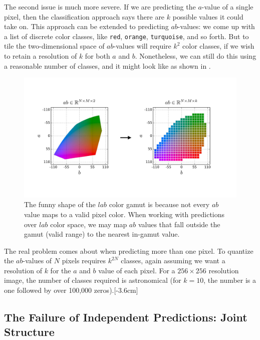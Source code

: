 The second issue is much more severe. If we are predicting the $a$-value of a single pixel, then the classification approach says there are $k$ possible values it could take on. This approach can be extended to predicting $ab$-values: we come up with a list of discrete color classes, like \texttt{red}, \texttt{orange}, \texttt{turquoise}, and so forth. But to tile the two-dimensional space of $ab$-values will require $k^2$ color classes, if we wish to retain a resolution of $k$ for both $a$ and $b$. Nonetheless, we can still do this using a reasonable number of classes, and it might look like as shown in \fig{\ref{fig:conditional_generative_models:color_quantization}}.
\begin{figure}[h!]
    \centerline{
        \includegraphics[width=0.8\linewidth]{./figures/conditional_generative_models/color_quantization.pdf}
    }
    \caption{The funny shape of the $lab$ color gamut is because not every $ab$ value maps to a valid pixel color. When working with predictions over $lab$ color space, we may map $ab$ values that fall outside the gamut (valid range) to the nearest in-gamut value.}
    \label{fig:conditional_generative_models:color_quantization}
\end{figure}

The real problem comes about when predicting more than one pixel. To quantize the $ab$-values of $N$ pixels requires $k^{2N}$ classes, again assuming we want a resolution of $k$ for the $a$ and $b$ value of each pixel. For a $256 \times 256$ resolution image, the number of classes required is astronomical (for $k=10$, the number is a one followed by over 100,000 zeros).[-3.6cm]

\subsection{The Failure of Independent Predictions: Joint Structure}

